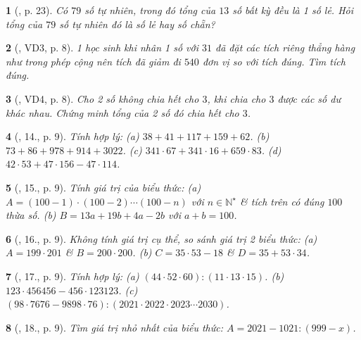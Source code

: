 \documentclass{article}
\newtheorem{baitoan}{}
\begin{document}
\begin{baitoan}[\cite{Binh_boi_duong_Toan_6_tap_1}, p. 23]
	Có $79$ số tự nhiên, trong đó tổng của $13$ số bất kỳ đều là 1 số lẻ. Hỏi tổng của $79$ số tự nhiên đó là số lẻ hay số chẵn?
\end{baitoan}

\begin{baitoan}[\cite{Tuyen_Toan_6}, VD3, p. 8]
	1 học sinh khi nhân 1 số với $31$ đã đặt các tích riêng thẳng hàng như trong phép cộng nên tích đã giảm đi $540$ đơn vị so với tích đúng. Tìm tích đúng.
\end{baitoan}

\begin{baitoan}[\cite{Tuyen_Toan_6}, VD4, p. 8]
	Cho 2 số không chia hết cho $3$, khi chia cho $3$ được các số dư khác nhau. Chứng minh tổng của 2 số đó chia hết cho $3$.
\end{baitoan}

\begin{baitoan}[\cite{Tuyen_Toan_6}, 14., p. 9]
	Tính hợp lý: (a) $38 + 41 + 117 + 159 + 62$. (b) $73 + 86 + 978 + 914 + 3022$. (c) $341\cdot67 + 341\cdot16 + 659\cdot83$. (d) $42\cdot53 + 47\cdot156 - 47\cdot114$.
\end{baitoan}

\begin{baitoan}[\cite{Tuyen_Toan_6}, 15., p. 9]
	Tính giá trị của biểu thức: (a) $A = (100 - 1)\cdot(100 - 2)\cdots(100 - n)$ với $n\in\mathbb{N}^\star$ \& tích trên có đúng $100$ thừa số. (b) $B = 13a + 19b + 4a - 2b$ với $a + b = 100$.
\end{baitoan}

\begin{baitoan}[\cite{Tuyen_Toan_6}, 16., p. 9]
	Không tính giá trị cụ thể, so sánh giá trị 2 biểu thức: (a) $A = 199\cdot201$ \& $B = 200\cdot200$. (b) $C = 35\cdot53 - 18$ \& $D = 35 + 53\cdot34$.
\end{baitoan}

\begin{baitoan}[\cite{Tuyen_Toan_6}, 17., p. 9]
	Tính hợp lý: (a) $(44\cdot52\cdot60):(11\cdot13\cdot15)$. (b) $123\cdot456456 - 456\cdot123123$. (c) $(98\cdot7676 - 9898\cdot76):(2021\cdot2022\cdot2023\cdots2030)$.
\end{baitoan}

\begin{baitoan}[\cite{Tuyen_Toan_6}, 18., p. 9]
	Tìm giá trị nhỏ nhất của biểu thức: $A = 2021 - 1021:(999 - x)$.
\end{baitoan}
\end{document}
